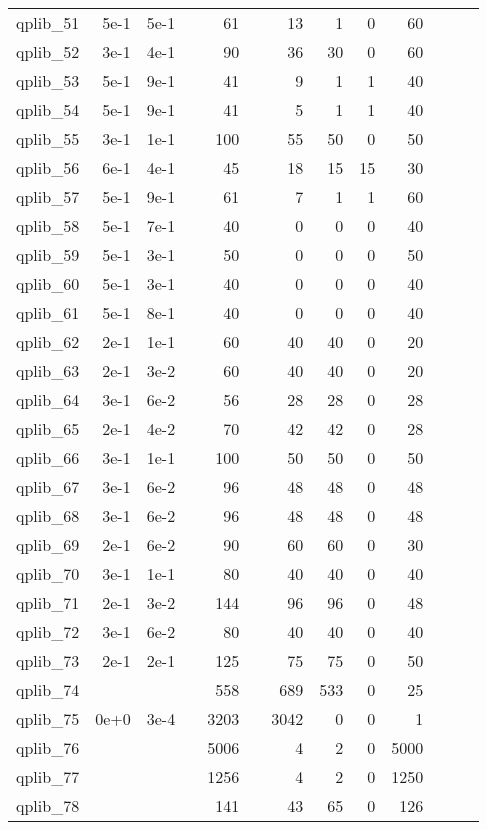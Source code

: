 \begin{table}
\begin{tabular}{lrrrrrrrrrrrr}
qplib\_51	&	5e-1	&	5e-1	&	&	61	&	&	13	&	1	&	0	&	60	\\
qplib\_52	&	3e-1	&	4e-1	&	&	90	&	&	36	&	30	&	0	&	60	\\
qplib\_53	&	5e-1	&	9e-1	&	&	41	&	&	9	&	1	&	1	&	40	\\
qplib\_54	&	5e-1	&	9e-1	&	&	41	&	&	5	&	1	&	1	&	40	\\
qplib\_55	&	3e-1	&	1e-1	&	&	100	&	&	55	&	50	&	0	&	50	\\
qplib\_56	&	6e-1	&	4e-1	&	&	45	&	&	18	&	15	&	15	&	30	\\
qplib\_57	&	5e-1	&	9e-1	&	&	61	&	&	7	&	1	&	1	&	60	\\
qplib\_58	&	5e-1	&	7e-1	&	&	40	&	&	0	&	0	&	0	&	40	\\
qplib\_59	&	5e-1	&	3e-1	&	&	50	&	&	0	&	0	&	0	&	50	\\
qplib\_60	&	5e-1	&	3e-1	&	&	40	&	&	0	&	0	&	0	&	40	\\
qplib\_61	&	5e-1	&	8e-1	&	&	40	&	&	0	&	0	&	0	&	40	\\
qplib\_62	&	2e-1	&	1e-1	&	&	60	&	&	40	&	40	&	0	&	20	\\
qplib\_63	&	2e-1	&	3e-2	&	&	60	&	&	40	&	40	&	0	&	20	\\
qplib\_64	&	3e-1	&	6e-2	&	&	56	&	&	28	&	28	&	0	&	28	\\
qplib\_65	&	2e-1	&	4e-2	&	&	70	&	&	42	&	42	&	0	&	28	\\
qplib\_66	&	3e-1	&	1e-1	&	&	100	&	&	50	&	50	&	0	&	50	\\
qplib\_67	&	3e-1	&	6e-2	&	&	96	&	&	48	&	48	&	0	&	48	\\
qplib\_68	&	3e-1	&	6e-2	&	&	96	&	&	48	&	48	&	0	&	48	\\
qplib\_69	&	2e-1	&	6e-2	&	&	90	&	&	60	&	60	&	0	&	30	\\
qplib\_70	&	3e-1	&	1e-1	&	&	80	&	&	40	&	40	&	0	&	40	\\
qplib\_71	&	2e-1	&	3e-2	&	&	144	&	&	96	&	96	&	0	&	48	\\
qplib\_72	&	3e-1	&	6e-2	&	&	80	&	&	40	&	40	&	0	&	40	\\
qplib\_73	&	2e-1	&	2e-1	&	&	125	&	&	75	&	75	&	0	&	50	\\
qplib\_74	&		&		&	&	558	&	&	689	&	533	&	0	&	25	\\
qplib\_75	&	0e+0	&	3e-4	&	&	3203	&	&	3042	&	0	&	0	&	1	\\
qplib\_76	&		&		&	&	5006	&	&	4	&	2	&	0	&	5000	\\
qplib\_77	&		&		&	&	1256	&	&	4	&	2	&	0	&	1250	\\
qplib\_78	&		&		&	&	141	&	&	43	&	65	&	0	&	126	\\

\end{tabular}
\end{table}

